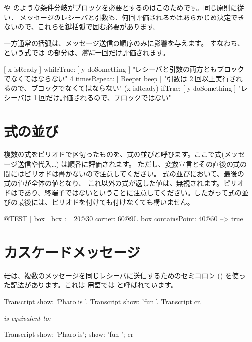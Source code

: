 \documentclass[a4paper,10pt,twoside]{book}
\begin{document}
 や  のような条件分岐がブロックを必要とするのはこのためです。同じ原則に従い、 メッセージのレシーバと引数も、何回評価されるかはあらかじめ決定できないので、これらを鍵括弧で囲む必要があります。

一方通常の括弧は、メッセージ送信の順序のみに影響を与えます。
すなわち、 という式では  の部分は、\emph{常に}一回だけ評価されます。

\begin{code}{}
[ x isReady ] whileTrue: [ y doSomething ]   "レシーバと引数の両方ともブロックでなくてはならない"
4 timesRepeat: [ Beeper beep ]                   "引数は 2 回以上実行されるので、ブロックでなくてはならない"
(x isReady) ifTrue: [ y doSomething ]           "レシーバは 1 回だけ評価されるので、ブロックではない"
\end{code}

\section{式の並び}
複数の式をピリオドで区切ったものを、式の並びと呼びます。ここで式(\ie メッセージ送信や代入\dots) は順番に評価されます。
ただし、変数宣言とその直後の式の間にはピリオドは書かないので注意してください。
式の並びにおいて、最後の式の値が全体の値となり、
これ以外の式が返した値は、無視されます。ピリオドはであり、終端子ではないということに注意してください。したがって式の並びの最後には、ピリオドを付けても付けなくても構いません。

\begin{code}{@TEST}
| box |
box := 20@30 corner: 60@90.
box containsPoint: 40@50 --> true
\end{code}

\section{カスケードメッセージ}
\st には、複数のメッセージを同じレシーバに送信するためのセミコロン (\ct{;}) を使った記法があります。これは \st 用語では  と呼ばれています。


\begin{minipage}{0.35\textwidth}
\begin{code}{}
Transcript show: 'Pharo is '.
Transcript show: 'fun '.
Transcript cr.
\end{code}
\end{minipage}
\emph{is equivalent to:}
\begin{minipage}{0.35\textwidth}
\begin{code}{}
Transcript        
   show: 'Pharo is';
   show: 'fun ';
   cr
\end{code}
\end{minipage}
\end{document}
